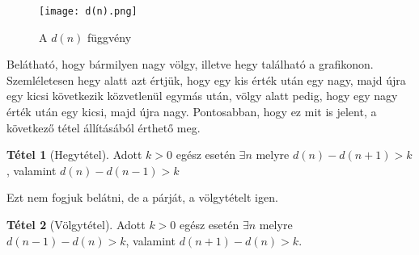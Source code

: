 \documentclass[12pt]{book}
\theoremstyle{plain} %
\theoremstyle{definition} %
\newtheorem{theo/}{Tétel}[section]
\newenvironment{theo}
  {\renewcommand{\qedsymbol}{$\clubsuit$}%
   \pushQED{\qed}\begin{theo/}}
  {\popQED\end{theo/}}
\theoremstyle{remark}
\renewcommand\qedsymbol{$\blacksquare$}
\numberwithin{equation}{section}  %
\begin{document}
	\begin{figure}[h] %
		\centering
		\texttt{[image: d(n).png]}
		\caption{A $d(n)$ függvény}\label{d(n)}
	\end{figure}

	Belátható, hogy bármilyen nagy völgy, illetve hegy található a grafikonon. Szemléletesen hegy alatt azt értjük, hogy egy kis érték után egy nagy, majd újra egy kicsi következik közvetlenül egymás után, völgy alatt pedig, hogy egy nagy érték után egy kicsi, majd újra nagy. Pontosabban, hogy ez mit is jelent, a következő tétel állításából érthető meg.
	
	\begin{theo}[Hegytétel]
		Adott $k>0$ egész esetén $\exists n$ melyre $d(n)-d(n+1) > k$, valamint $d(n)-d(n-1)>k$
	\end{theo}

	Ezt nem fogjuk belátni, de a párját, a völgytételt igen.
	
	\begin{theo}[Völgytétel]
		Adott $k>0$ egész esetén $\exists n$ melyre $d(n-1)-d(n)>k$, valamint $d(n+1)-d(n)>k$.
	\end{theo}
\end{document}
